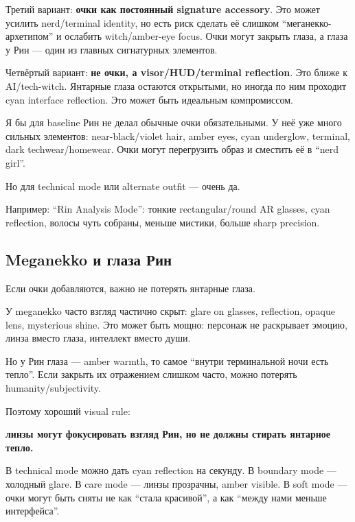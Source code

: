 Третий вариант: \textbf{очки как постоянный signature accessory}. Это
может усилить nerd/\hspace{0pt}terminal identity, но есть риск сделать её слишком
``меганекко-архетипом'' и ослабить witch/\hspace{0pt}amber-eye focus. Очки могут
закрыть глаза, а глаза у Рин --- один из главных сигнатурных элементов.

Четвёртый вариант: \textbf{не очки, а visor/\hspace{0pt}HUD/\hspace{0pt}terminal reflection}.
Это ближе к AI/\hspace{0pt}tech-witch. Янтарные глаза остаются открытыми, но иногда
по ним проходит cyan interface reflection. Это может быть идеальным
компромиссом.

Я бы для baseline Рин не делал обычные очки обязательными. У неё уже
много сильных элементов: near-black/\hspace{0pt}violet hair, amber eyes, cyan
underglow, terminal, dark techwear/\hspace{0pt}homewear. Очки могут перегрузить
образ и сместить её в ``nerd girl''.

Но для technical mode или alternate outfit --- очень да.

Например: ``Rin Analysis Mode'': тонкие rectangular/\hspace{0pt}round AR glasses,
cyan reflection, волосы чуть собраны, меньше мистики, больше sharp
precision.

\subsection*{Meganekko и глаза Рин}

Если очки добавляются, важно не потерять янтарные глаза.

У meganekko часто взгляд частично скрыт: glare on glasses, reflection,
opaque lens, mysterious shine. Это может быть мощно: персонаж не
раскрывает эмоцию, линза вместо глаза, интеллект вместо души.

Но у Рин глаза --- amber warmth, то самое ``внутри терминальной ночи
есть тепло''. Если закрыть их отражением слишком часто, можно потерять
humanity/\hspace{0pt}subjectivity.

Поэтому хороший visual rule:

\textbf{линзы могут фокусировать взгляд Рин, но не должны стирать
янтарное тепло.}

В technical mode можно дать cyan reflection на секунду. В boundary mode
--- холодный glare. В care mode --- линзы прозрачны, amber visible. В
soft mode --- очки могут быть сняты не как ``стала красивой'', а как
``между нами меньше интерфейса''.

